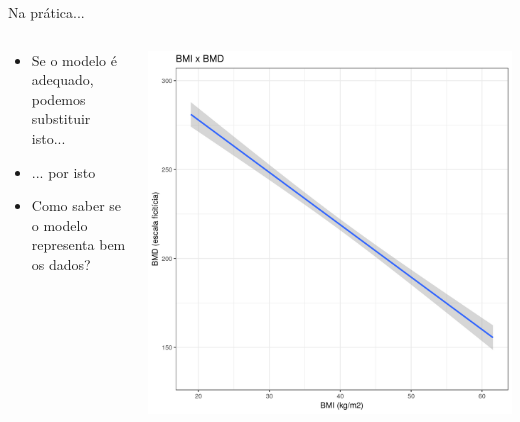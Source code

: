 \documentclass{beamer}
\begin{document}
\begin{frame}{Na prática...}
  \begin{columns}
    \begin{column}{5cm}
      \begin{itemize}
        \small
      \item \alert{Se o modelo é adequado}, podemos substituir isto...
        \bigskip
      \item ... por isto
        \bigskip
      \item<2> Como saber se o modelo representa bem os dados?
      \end{itemize}
    \end{column}
    \begin{column}{5cm}
      \begin{center}
        \includegraphics[width=1.1\textwidth]{Cap18-19/pratica-rls3}
      \end{center}
    \end{column}
  \end{columns}
\end{frame}
\end{document}
